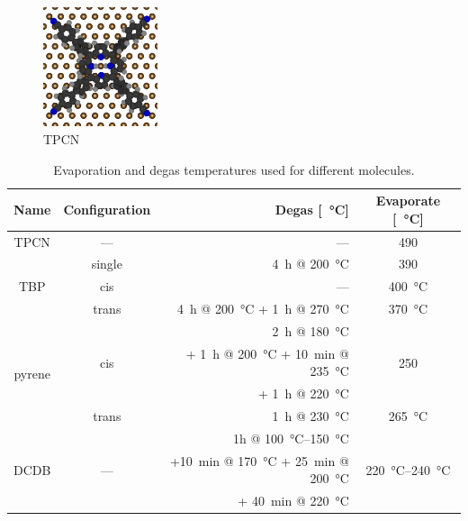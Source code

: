 \begin{figure}[ht]
 \begin{center}
  \includegraphics[width=0.3\textwidth]{./images/TPCN-top.jpg}
 \end{center}
\caption{TPCN}
\end{figure}
\begin{table}
 \centering
 \caption{Evaporation and degas temperatures used for different molecules.}
 \begin{tabular}{ccrc}
Name			& Configuration & Degas [\SI{}{\degreeCelsius}]	& Evaporate [\SI{}{\degreeCelsius}]	\\ \hline \hline 
TPCN			& ---		& ---		& 490		\\ \hline 
\multirow{3}{*}{TBP}	&single		& \SI{4}{\hour} @ \SI{200}{\degreeCelsius}& 390	\\
			&cis		& ---		& \SI{400}{\degreeCelsius}\\
			&trans		& \SI{4}{\hour} @ \SI{200}{\degreeCelsius} + \SI{1}{\hour} @ \SI{270}{\degreeCelsius}&\SI{370}{\degreeCelsius}\\ \hline 
\multirow{4}{*}{pyrene} & \multirow{3}{*}{cis}		& \SI{2}{\hour} @ \SI{180}{\degreeCelsius}&	\multirow{3}{*}{250}	\\
&&+ \SI{1}{\hour} @ \SI{200}{\degreeCelsius} + \SI{10}{\minute} @ \SI{235}{\degreeCelsius} 	&\\
&&+ \SI{1}{\hour} @ \SI{220}{\degreeCelsius}&\\ 
			&trans		& \SI{1}{\hour} @ \SI{230}{\degreeCelsius}		&\SI{265}{\degreeCelsius}		\\ \hline
\multirow{3}{*}{DCDB} & \multirow{3}{*}{---} & 1h @ \SIrange{100}{150}{\degreeCelsius}& \multirow{3}{*}{\SIrange{220}{240}{\degreeCelsius}}\\
&&+\SI{10}{\minute} @ \SI{170}{\degreeCelsius} + \SI{25}{\minute} @ \SI{200}{\degreeCelsius} & \\
&&+ \SI{40}{\minute} @ \SI{220}{\degreeCelsius}&\\
 \end{tabular}
\label{tab:molecule-temperatures}
\end{table}


